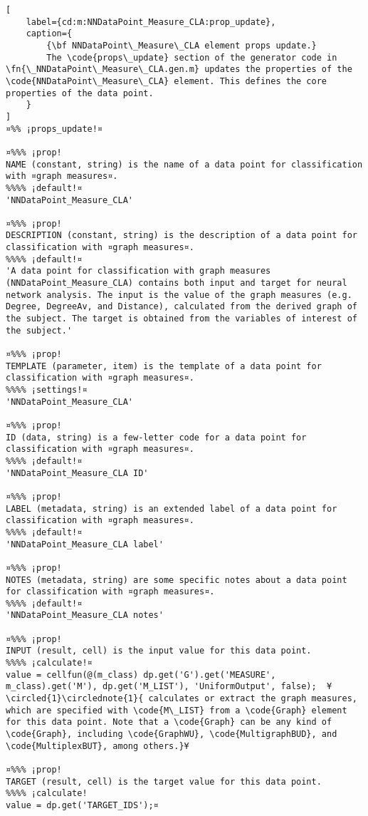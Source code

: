 \documentclass{tufte-handout}
\begin{document}
\begin{lstlisting}[
	label={cd:m:NNDataPoint_Measure_CLA:prop_update},
	caption={
		{\bf NNDataPoint\_Measure\_CLA element props update.}
		The \code{props\_update} section of the generator code in \fn{\_NNDataPoint\_Measure\_CLA.gen.m} updates the properties of the \code{NNDataPoint\_Measure\_CLA} element. This defines the core properties of the data point.
	}
]
¤%% ¡props_update!¤

¤%%% ¡prop!
NAME (constant, string) is the name of a data point for classification with ¤graph measures¤.
%%%% ¡default!¤
'NNDataPoint_Measure_CLA'

¤%%% ¡prop!
DESCRIPTION (constant, string) is the description of a data point for classification with ¤graph measures¤.
%%%% ¡default!¤
'A data point for classification with graph measures (NNDataPoint_Measure_CLA) contains both input and target for neural network analysis. The input is the value of the graph measures (e.g. Degree, DegreeAv, and Distance), calculated from the derived graph of the subject. The target is obtained from the variables of interest of the subject.'

¤%%% ¡prop!
TEMPLATE (parameter, item) is the template of a data point for classification with ¤graph measures¤.
%%%% ¡settings!¤
'NNDataPoint_Measure_CLA'

¤%%% ¡prop!
ID (data, string) is a few-letter code for a data point for classification with ¤graph measures¤.
%%%% ¡default!¤
'NNDataPoint_Measure_CLA ID'

¤%%% ¡prop!
LABEL (metadata, string) is an extended label of a data point for classification with ¤graph measures¤.
%%%% ¡default!¤
'NNDataPoint_Measure_CLA label'

¤%%% ¡prop!
NOTES (metadata, string) are some specific notes about a data point for classification with ¤graph measures¤.
%%%% ¡default!¤
'NNDataPoint_Measure_CLA notes'

¤%%% ¡prop!
INPUT (result, cell) is the input value for this data point.
%%%% ¡calculate!¤ 
value = cellfun(@(m_class) dp.get('G').get('MEASURE', m_class).get('M'), dp.get('M_LIST'), 'UniformOutput', false);  ¥\circled{1}\circlednote{1}{ calculates or extract the graph measures, which are specified with \code{M\_LIST} from a \code{Graph} element for this data point. Note that a \code{Graph} can be any kind of \code{Graph}, including \code{GraphWU}, \code{MultigraphBUD}, and \code{MultiplexBUT}, among others.}¥
    
¤%%% ¡prop!
TARGET (result, cell) is the target value for this data point.
%%%% ¡calculate!
value = dp.get('TARGET_IDS');¤

\end{lstlisting}
\end{document}
